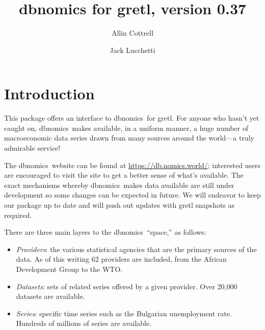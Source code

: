 \documentclass{article}
\begin{document}
\setlength{\parindent}{0pt}
\setlength{\parskip}{1ex}
\setcounter{secnumdepth}{1}


\newenvironment{funcdoc}
{\noindent\hrulefill\\[-10pt]}
{\medskip}

\newcommand{\argname}[1]{\textsl{#1}}
\newcommand{\DB}{\textsf{dbnomics}}
  
\title{dbnomics for gretl, version 0.37}
\author{Allin Cottrell \and Jack Lucchetti}
\maketitle

\section{Introduction}

This package offers an interface to \DB\ for gretl. For
anyone who hasn't yet caught on, \DB\  makes available, in
a uniform manner, a huge number of macroeconomic data series drawn
from many sources around the world---a truly admirable service!

The \DB\ website can be found at \url{https://db.nomics.world/};
interested users are encouraged to visit the site to get a better
sense of what's available. The exact mechanisms whereby \DB\ makes
data available are still under development so some changes can be
expected in future. We will endeavor to keep our package up to date
and will push out updates with gretl snapshots as required.

There are three main layers to the \DB\ ``space,'' as
follows:
\begin{itemize}
\item \textit{Providers}: the various statistical agencies that are
  the primary sources of the data. As of this writing 62 providers
  are included, from the African Development Group to the WTO.
\item \textit{Datasets}: sets of related series offered by a given
  provider. Over 20,000 datasets are available.
\item \textit{Series}: specific time series such as the Bulgarian
  unemployment rate. Hundreds of millions of series are available.
\end{itemize}
\end{document}
